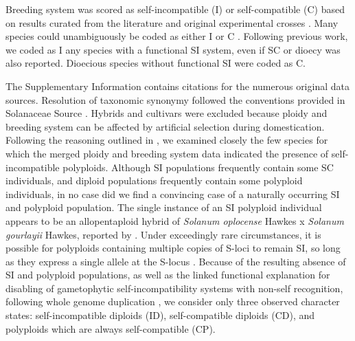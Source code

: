 Breeding system was scored as self-incompatible (I) or self-compatible (C) based on results curated from the literature and  original experimental crosses \citep[as compiled in][]{igic_2006, goldberg_2010, robertson_2011, goldberg_2012}.
Many species could unambiguously be coded as either I or C \citep{raduski_2012}.
Following previous work, we coded as I any species with a functional SI system, even if SC or dioecy was also reported.
Dioecious species without functional SI were coded as C.

The Supplementary Information contains citations for the numerous original data sources. %
Resolution of taxonomic synonymy followed the conventions provided in Solanaceae Source \citep{solsource}. 
Hybrids and cultivars were excluded because ploidy and breeding system can be affected by artificial selection during domestication.
Following the reasoning outlined in \citet{robertson_2011}, we examined closely the few species for which the merged ploidy and breeding system data indicated the presence of self-incompatible polyploids.
Although SI populations frequently contain some SC individuals, and diploid populations frequently contain some polyploid individuals, in no case did we find a convincing case of a naturally occurring SI and polyploid population.
The single instance of an SI polyploid individual appears to be an allopentaploid hybrid of \textit{Solanum oplocense} Hawkes x \textit{Solanum gourlayii} Hawkes, reported by \citet{camadro_1981}.
Under exceedingly rare circumstances, it is possible for polyploids containing multiple copies of S-loci to remain SI, so long as they express a single allele at the S-locus \citep[discussed in][]{robertson_2011}.
Because of the resulting absence of SI and polyploid populations, as well as the linked functional explanation for disabling of gametophytic self-incompatibility systems with non-self recognition, following whole genome duplication \citep[reviewed in][]{ramsey_1998,stone_2002}, we consider only three observed character states: self-incompatible diploids (ID), self-compatible diploids (CD), and polyploids which are always self-compatible (CP).

